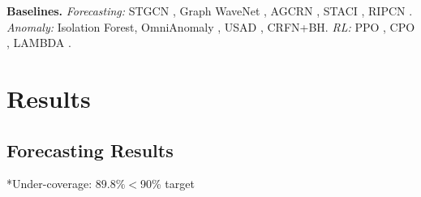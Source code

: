 \documentclass{article}
\theoremstyle{plain}
\theoremstyle{definition}
\theoremstyle{remark}
\begin{document}
\textbf{Baselines.} \emph{Forecasting:} STGCN \citep{yu2018spatio}, Graph WaveNet \citep{wu2019graph}, AGCRN \citep{bai2020adaptive}, STACI \citep{xu2024staci}, RIPCN \citep{wu2023ripcn}. \emph{Anomaly:} Isolation Forest, OmniAnomaly \citep{su2019robust}, USAD \citep{audibert2020usad}, CRFN+BH. \emph{RL:} PPO \citep{schulman2017proximal}, CPO \citep{achiam2017constrained}, LAMBDA \citep{as2022constrained}.



\section{Results}
\label{sec:results}

\subsection{Forecasting Results}
\label{sec:forecast_results}

\begin{table}[t]
\centering
\caption{Forecasting results on T-Drive (1-hour horizon). Coverage target: 90\%. Best in \textbf{bold}, second \underline{underlined}.}
\label{tab:forecast}
\vspace{-2mm}
\footnotesize{*Under-coverage: $89.8\% < $90\% target}
\end{table}
\end{document}
